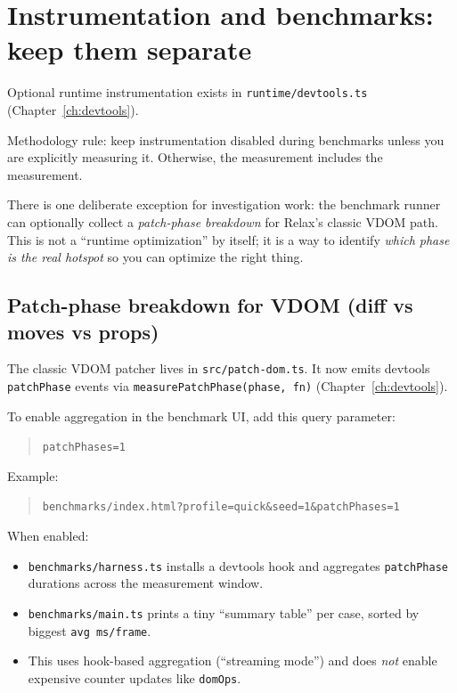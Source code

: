 \section{Instrumentation and benchmarks: keep them separate}

Optional runtime instrumentation exists in \texttt{runtime/devtools.ts} (Chapter~\ref{ch:devtools}).

Methodology rule: keep instrumentation disabled during benchmarks unless you are explicitly measuring it.
Otherwise, the measurement includes the measurement.

There is one deliberate exception for investigation work: the benchmark runner can optionally collect a \emph{patch-phase breakdown} for Relax's classic VDOM path.
This is not a ``runtime optimization'' by itself; it is a way to identify \emph{which phase is the real hotspot} so you can optimize the right thing.

\subsection{Patch-phase breakdown for VDOM (diff vs moves vs props)}

The classic VDOM patcher lives in \texttt{src/patch-dom.ts}.
It now emits devtools \texttt{patchPhase} events via \texttt{measurePatchPhase(phase, fn)} (Chapter~\ref{ch:devtools}).

To enable aggregation in the benchmark UI, add this query parameter:

\begin{quote}
		\texttt{patchPhases=1}
\end{quote}

Example:

\begin{quote}
		\texttt{benchmarks/index.html?profile=quick\&seed=1\&patchPhases=1}
\end{quote}

When enabled:

\begin{itemize}
\item \texttt{benchmarks/harness.ts} installs a devtools hook and aggregates \texttt{patchPhase} durations across the measurement window.
\item \texttt{benchmarks/main.ts} prints a tiny ``summary table'' per case, sorted by biggest \texttt{avg ms/frame}.
\item This uses hook-based aggregation (``streaming mode'') and does \emph{not} enable expensive counter updates like \texttt{domOps}.
\end{itemize}

